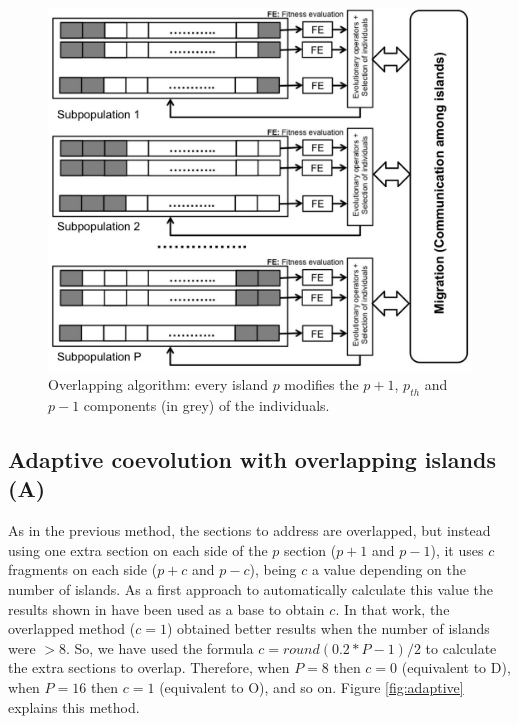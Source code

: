 \documentclass[Crown,sagev,times,doublespace]{sagej}
\begin{document}
\begin{figure}
\centering
\includegraphics[width=12cm]{islandNoDisjoint.jpg}
\caption{Overlapping algorithm: every island $p$ modifies the  $p+1$,
  $p_{th}$ and $p-1$  components (in grey) of the individuals.}
  \label{fig:overlapping}
\end{figure}

\subsection{Adaptive coevolution with overlapping islands (A)} 
As in the previous method, the sections to address are overlapped, but instead using one extra section on each side of the $p$ section ($p+1$ and $p-1$), it uses $c$ fragments on each side ($p+c$ and $p-c$), being $c$ a value depending on the number of islands. As a first approach to automatically calculate this value the results shown in \citep{Garcia16hpmoonANONYMOUS} have been used as a base to obtain $c$. In that work, the overlapped method ($c=1$) obtained better results when the number of islands were $>$8. So, we have used the formula $c=round(0.2*P-1)/2$ to calculate the extra sections to overlap. Therefore, when $P=8$ then $c=0$ (equivalent to D), when $P=16$ then $c=1$ (equivalent to O), and so on. Figure \ref{fig:adaptive} explains this method.
\end{document}
